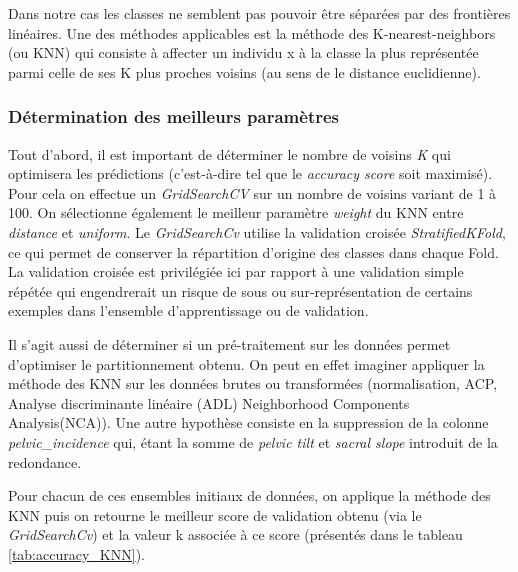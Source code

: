 \documentclass[twocolumn,10pt]{article}
\begin{document}
Dans notre cas les classes ne semblent pas pouvoir être séparées par des frontières linéaires. Une des méthodes applicables est la méthode des K-nearest-neighbors (ou KNN) qui consiste à affecter un individu x à la classe la plus représentée parmi celle de ses K plus proches voisins (au sens de le distance euclidienne).

\subsubsection{Détermination des meilleurs paramètres}

Tout d'abord, il est important de déterminer le nombre de voisins \textit{K} qui optimisera les prédictions (c'est-à-dire tel que le \textit{accuracy score} soit maximisé).
Pour cela on effectue un \textit{GridSearchCV} sur un nombre de voisins variant de 1 à 100. On sélectionne également le meilleur paramètre \textit{weight} du KNN entre \textit{distance} et \textit{uniform}.
Le \textit{GridSearchCv} utilise la validation croisée \textit{StratifiedKFold}, ce qui permet de conserver la répartition d'origine des classes dans chaque Fold. La validation croisée est privilégiée ici par rapport à une validation simple répétée qui engendrerait un risque de sous ou sur-représentation de certains exemples dans l'ensemble d'apprentissage ou de validation.

Il s'agit aussi de déterminer si un pré-traitement sur les données permet d'optimiser le partitionnement obtenu. On peut en effet imaginer appliquer la méthode des KNN sur les données brutes ou transformées (normalisation, ACP, Analyse discriminante linéaire (ADL) Neighborhood Components Analysis(NCA)). Une autre hypothèse consiste en la suppression de la colonne \textit{pelvic\_incidence} qui, étant la somme de \textit{pelvic tilt} et \textit{sacral slope} introduit de la redondance.

Pour chacun de ces ensembles initiaux de données, on applique la méthode des KNN puis on retourne le meilleur score de validation obtenu (via le \textit{GridSearchCv}) et la valeur k associée à ce score (présentés dans le tableau \ref{tab:accuracy_KNN}).
\end{document}
